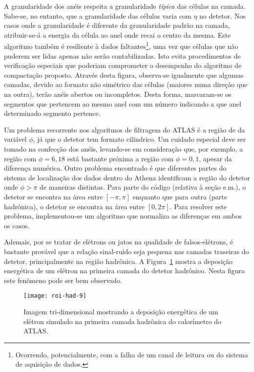 A granularidade dos anéis respeita a granularidade \emph{típica} das células
na camada. Sabe-se, no entanto, que a granularidade das células varia com
$\eta$ no detetor. Nos casos onde a granularidade é diferente da granularidade
padrão na camada, atribuir-se-á a energia da célula ao anel onde recai o
centro da mesma. Este algoritmo também é resiliente à dados
faltantes\footnote{Ocorrendo, potencialmente, com a falha de um canal de
leitura ou do sistema de aquisição de dados.}, uma vez que células que não
puderem ser lidas apenas não serão contabilizadas. Isto evita procedimentos de
verificação especiais que poderiam comprometer o desempenho do algoritmo de
compactação proposto. Através desta figura, observa-se igualmente que algumas
camadas, devido ao formato não simétrico das células (maiores numa direção que
na outra), terão anéis abertos ou incompletos. Desta forma, marcaram-se os
segmentos que pertencem ao mesmo anel com um número indicando a que anel
determinado segmento pertence.

Um problema recorrente nos algoritmos de filtragem do ATLAS é a região de
 da variável $\phi$, já que o detetor tem formato
cilíndrico. Um cuidado especial deve ser tomado na confecção dos anéis,
levando-se em consideração que, por exemplo, a região com $\phi = 6,18$ está
bastante próxima a região com $\phi = 0,1$, apesar da diferença
numérica. Outro problema encontrado é que diferentes partes do sistema de
localização dos dados dentro do Athena identificam a região do detetor onde
$\phi > \pi$ de maneiras distintas. Para parte do código (relativa à seção
e.m.), o detetor se encontra na área entre $[-\pi, \pi]$ enquanto que para
outra (parte hadrônica), o detetor se encontra na área entre $[0, 2\pi]$. Para
resolver este problema, implementou-se um algoritmo que normaliza as
diferenças em ambos os casos.

Ademais, por se tratar de elétrons ou jatos na qualidade de falsos-elétrons, é
bastante provável que a relação sinal-ruído seja pequena nas camadas traseiras
do detetor, principalmente na região hadrônica. A Figura~\ref{fig:roi-had-9}
mostra a deposição energética de um elétron na primeira camada do detetor
hadrônico. Nesta figura este fenômeno pode ser bem observado.

\begin{figure}
\begin{center}
\texttt{[image: roi-had-9]}
\end{center}
\caption{Imagem tri-dimensional mostrando a deposição energética de
um elétron simulado na primeira camada hadrônica do calorímetro do ATLAS.}
\label{fig:roi-had-9}
\end{figure}

